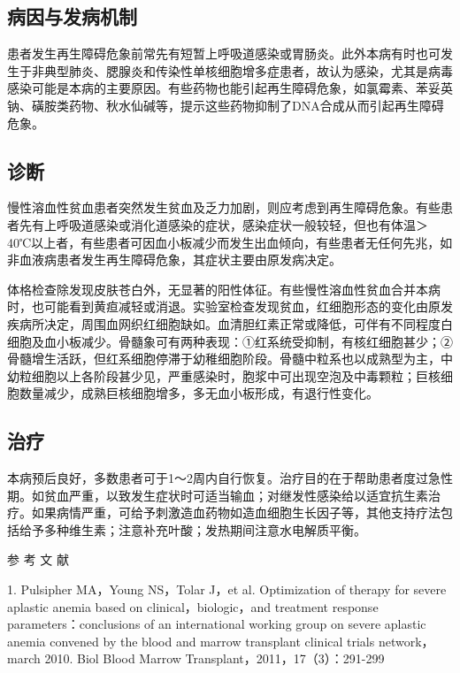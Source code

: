 \subsection{病因与发病机制}

患者发生再生障碍危象前常先有短暂上呼吸道感染或胃肠炎。此外本病有时也可发生于非典型肺炎、腮腺炎和传染性单核细胞增多症患者，故认为感染，尤其是病毒感染可能是本病的主要原因。有些药物也能引起再生障碍危象，如氯霉素、苯妥英钠、磺胺类药物、秋水仙碱等，提示这些药物抑制了DNA合成从而引起再生障碍危象。

\subsection{诊断}

慢性溶血性贫血患者突然发生贫血及乏力加剧，则应考虑到再生障碍危象。有些患者先有上呼吸道感染或消化道感染的症状，感染症状一般较轻，但也有体温＞
40℃以上者，有些患者可因血小板减少而发生出血倾向，有些患者无任何先兆，如非血液病患者发生再生障碍危象，其症状主要由原发病决定。

体格检查除发现皮肤苍白外，无显著的阳性体征。有些慢性溶血性贫血合并本病时，也可能看到黄疸减轻或消退。实验室检查发现贫血，红细胞形态的变化由原发疾病所决定，周围血网织红细胞缺如。血清胆红素正常或降低，可伴有不同程度白细胞及血小板减少。骨髓象可有两种表现：①红系统受抑制，有核红细胞甚少；②骨髓增生活跃，但红系细胞停滞于幼稚细胞阶段。骨髓中粒系也以成熟型为主，中幼粒细胞以上各阶段甚少见，严重感染时，胞浆中可出现空泡及中毒颗粒；巨核细胞数量减少，成熟巨核细胞增多，多无血小板形成，有退行性变化。

\subsection{治疗}

本病预后良好，多数患者可于1～2周内自行恢复。治疗目的在于帮助患者度过急性期。如贫血严重，以致发生症状时可适当输血；对继发性感染给以适宜抗生素治疗。如果病情严重，可给予刺激造血药物如造血细胞生长因子等，其他支持疗法包括给予多种维生素；注意补充叶酸；发热期间注意水电解质平衡。

\protect\hypertarget{text00091.html}{}{}

\hypertarget{text00091.htmlux5cux23CHP3-10-3}{}
参 考 文 献

1. Pulsipher MA，Young NS，Tolar J，et al. Optimization of therapy for
severe aplastic anemia based on clinical，biologic，and treatment
response parameters：conclusions of an international working group on
severe aplastic anemia convened by the blood and marrow transplant
clinical trials network，march 2010. Biol Blood Marrow
Transplant，2011，17（3）：291-299


